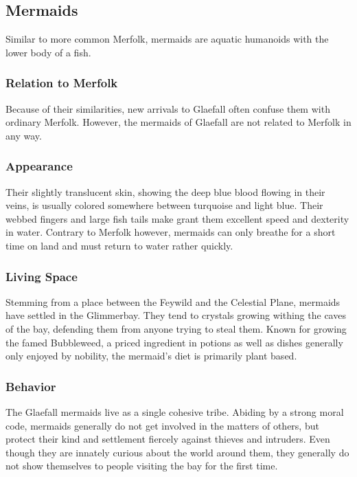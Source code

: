 \subsection{Mermaids}

\begin{multicols}{2}
    Similar to more common Merfolk, mermaids are aquatic humanoids with the lower body of a fish.

    \subsubsection{Relation to Merfolk}
    Because of their similarities, new arrivals to Glaefall often confuse them with ordinary Merfolk.
    However, the mermaids of Glaefall are not related to Merfolk in any way.

    \subsubsection{Appearance}
    Their slightly translucent skin, showing the deep blue blood flowing in their veins, is usually colored somewhere between turquoise and light blue.
    Their webbed fingers and large fish tails make grant them excellent speed and dexterity in water.
    Contrary to Merfolk however, mermaids can only breathe for a short time on land and must return to water rather quickly.

    \subsubsection{Living Space}
    Stemming from a place between the Feywild and the Celestial Plane, mermaids have settled in the Glimmerbay.
    They tend to crystals growing withing the caves of the bay, defending them from anyone trying to steal them.
    Known for growing the famed Bubbleweed, a priced ingredient in potions as well as dishes generally only enjoyed by nobility, the mermaid's diet is primarily plant based.

    \subsubsection{Behavior}
    The Glaefall mermaids live as a single cohesive tribe.
    Abiding by a strong moral code, mermaids generally do not get involved in the matters of others, but protect their kind and settlement fiercely against thieves and intruders.
    Even though they are innately curious about the world around them, they generally do not show themselves to people visiting the bay for the first time.

\end{multicols}

